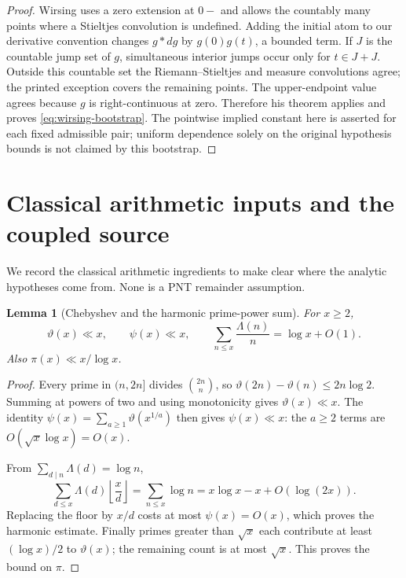 \documentclass[11pt,letterpaper]{article}
\numberwithin{equation}{section}
\newtheorem{lemma}[theorem]{Lemma}
\theoremstyle{definition}
\theoremstyle{remark}
\begin{document}
\begin{proof}
Wirsing uses a zero extension at $0-$ and allows the countably many
points where a Stieltjes convolution is undefined. Adding the initial
atom to our derivative convention changes $g*dg$ by $g(0)g(t)$, a bounded
term. If $J$ is the countable jump set of $g$, simultaneous interior
jumps occur only for $t\in J+J$. Outside this countable set the
Riemann--Stieltjes and measure convolutions agree; the printed exception
covers the remaining points. The upper-endpoint value agrees because
$g$ is right-continuous at zero. Therefore his theorem applies
and proves \eqref{eq:wirsing-bootstrap}. The pointwise implied constant
here is asserted for each fixed admissible pair; uniform dependence solely
on the original hypothesis bounds is not claimed by this bootstrap.
\end{proof}

\section{Classical arithmetic inputs and the coupled source}\label{sec:inputs}

We record the classical arithmetic ingredients to make clear where the
analytic hypotheses come from. None is a PNT remainder assumption.

\begin{lemma}[Chebyshev and the harmonic prime-power sum]\label{lem:elementary}
For $x\ge2$,
\begin{equation}\label{eq:elementary}
 \vartheta(x)\ll x,\qquad \psi(x)\ll x,\qquad
 \sum_{n\le x}\frac{\Lambda(n)}n=\log x+O(1).
\end{equation}
Also $\pi(x)\ll x/\log x$.
\end{lemma}
\begin{proof}
Every prime in $(n,2n]$ divides $\binom{2n}{n}$, so
$\vartheta(2n)-\vartheta(n)\le2n\log2$. Summing at powers of two and using
monotonicity gives $\vartheta(x)\ll x$. The identity
$\psi(x)=\sum_{a\ge1}\vartheta(x^{1/a})$ then gives $\psi(x)\ll x$:
the $a\ge2$ terms are $O(\sqrt{x}\log x)=O(x)$.

From $\sum_{d\mid n}\Lambda(d)=\log n$,
\[
 \sum_{d\le x}\Lambda(d)\left\lfloor\frac xd\right\rfloor
 =\sum_{n\le x}\log n=x\log x-x+O(\log(2x)).
\]
Replacing the floor by $x/d$ costs at most $\psi(x)=O(x)$, which proves
the harmonic estimate. Finally primes greater than $\sqrt{x}$ each
contribute at least $(\log x)/2$ to $\vartheta(x)$; the remaining count
is at most $\sqrt{x}$. This proves the bound on $\pi$.
\end{proof}
\end{document}

